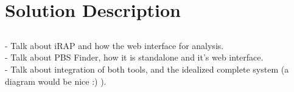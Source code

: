 \chapter{Solution Description} \label{chap:description}

\section*{}

\begin{Notes}
- Talk about iRAP and how the web interface for analysis.\\
- Talk about PBS Finder, how it is standalone and it's web interface.\\
- Talk about integration of both tools, and the idealized complete system (a
diagram would be nice :) ).\\
\end{Notes}
